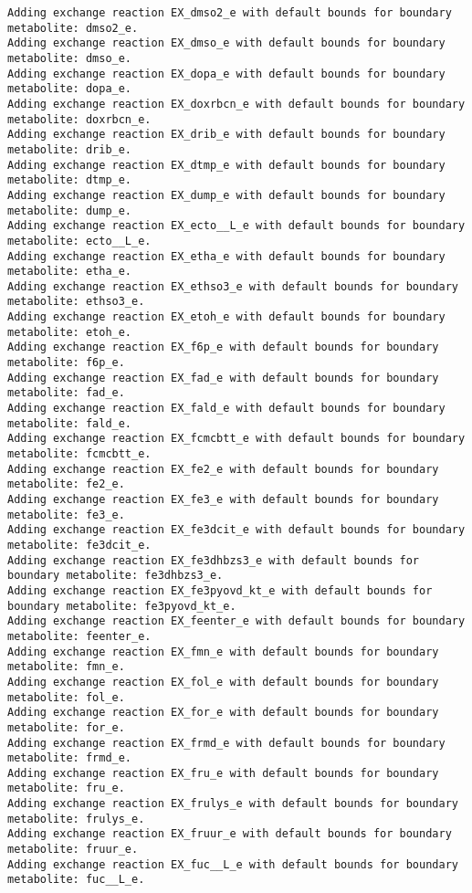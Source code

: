 \documentclass[
  letterpaper,
  DIV=11,
  numbers=noendperiod]{scrartcl}
\begin{document}
\begin{verbatim}
Adding exchange reaction EX_dmso2_e with default bounds for boundary metabolite: dmso2_e.
Adding exchange reaction EX_dmso_e with default bounds for boundary metabolite: dmso_e.
Adding exchange reaction EX_dopa_e with default bounds for boundary metabolite: dopa_e.
Adding exchange reaction EX_doxrbcn_e with default bounds for boundary metabolite: doxrbcn_e.
Adding exchange reaction EX_drib_e with default bounds for boundary metabolite: drib_e.
Adding exchange reaction EX_dtmp_e with default bounds for boundary metabolite: dtmp_e.
Adding exchange reaction EX_dump_e with default bounds for boundary metabolite: dump_e.
Adding exchange reaction EX_ecto__L_e with default bounds for boundary metabolite: ecto__L_e.
Adding exchange reaction EX_etha_e with default bounds for boundary metabolite: etha_e.
Adding exchange reaction EX_ethso3_e with default bounds for boundary metabolite: ethso3_e.
Adding exchange reaction EX_etoh_e with default bounds for boundary metabolite: etoh_e.
Adding exchange reaction EX_f6p_e with default bounds for boundary metabolite: f6p_e.
Adding exchange reaction EX_fad_e with default bounds for boundary metabolite: fad_e.
Adding exchange reaction EX_fald_e with default bounds for boundary metabolite: fald_e.
Adding exchange reaction EX_fcmcbtt_e with default bounds for boundary metabolite: fcmcbtt_e.
Adding exchange reaction EX_fe2_e with default bounds for boundary metabolite: fe2_e.
Adding exchange reaction EX_fe3_e with default bounds for boundary metabolite: fe3_e.
Adding exchange reaction EX_fe3dcit_e with default bounds for boundary metabolite: fe3dcit_e.
Adding exchange reaction EX_fe3dhbzs3_e with default bounds for boundary metabolite: fe3dhbzs3_e.
Adding exchange reaction EX_fe3pyovd_kt_e with default bounds for boundary metabolite: fe3pyovd_kt_e.
Adding exchange reaction EX_feenter_e with default bounds for boundary metabolite: feenter_e.
Adding exchange reaction EX_fmn_e with default bounds for boundary metabolite: fmn_e.
Adding exchange reaction EX_fol_e with default bounds for boundary metabolite: fol_e.
Adding exchange reaction EX_for_e with default bounds for boundary metabolite: for_e.
Adding exchange reaction EX_frmd_e with default bounds for boundary metabolite: frmd_e.
Adding exchange reaction EX_fru_e with default bounds for boundary metabolite: fru_e.
Adding exchange reaction EX_frulys_e with default bounds for boundary metabolite: frulys_e.
Adding exchange reaction EX_fruur_e with default bounds for boundary metabolite: fruur_e.
Adding exchange reaction EX_fuc__L_e with default bounds for boundary metabolite: fuc__L_e.

\end{verbatim}
\end{document}
